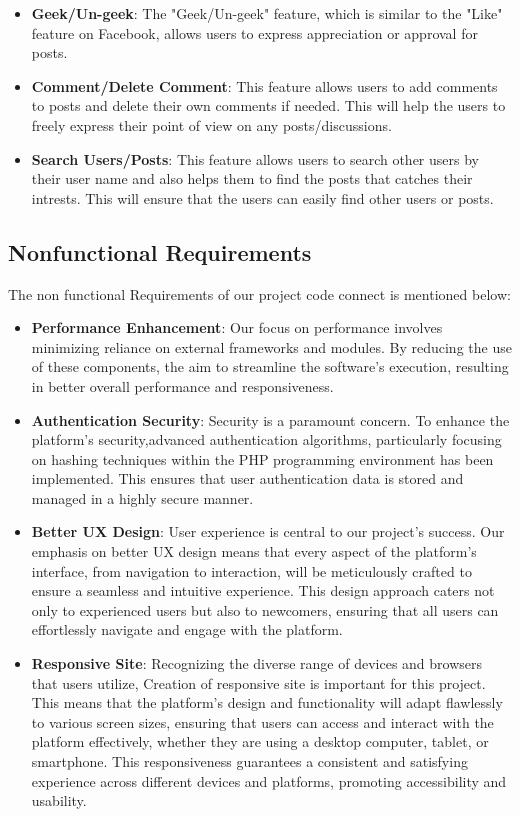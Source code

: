 \begin{itemize}
    \item \textbf{Geek/Un-geek}:
      The "Geek/Un-geek" feature, which is similar to the "Like" feature on Facebook, allows users to express appreciation or approval for posts. 

    \item \textbf{Comment/Delete Comment}:
      This feature allows users to add comments to posts and delete their own comments if needed. This will help the users to freely express their point of view on any posts/discussions. 

    \item \textbf{Search Users/Posts}:
    This feature allows users to search other users by their user name and also helps them to find the posts that catches their intrests. This will ensure that the users can easily find other users or posts.

  \end{itemize}
\subsection{Nonfunctional Requirements}
The non functional Requirements of our project code connect is mentioned below:
\begin{itemize}
    \item \textbf{Performance Enhancement}: Our focus on performance involves minimizing reliance on external frameworks and modules. By reducing the use of these components, the aim to streamline the software's execution, resulting in better overall performance and responsiveness.
    \item \textbf{Authentication Security}: Security is a paramount concern. To enhance the platform's security,advanced authentication algorithms, particularly focusing on hashing techniques within the PHP programming environment has been implemented. This ensures that user authentication data is stored and managed in a highly secure manner.
    \item \textbf{Better UX Design}: User experience is central to our project's success. Our emphasis on better UX design means that every aspect of the platform's interface, from navigation to interaction, will be meticulously crafted to ensure a seamless and intuitive experience. This design approach caters not only to experienced users but also to newcomers, ensuring that all users can effortlessly navigate and engage with the platform.
    \item \textbf{Responsive Site}: Recognizing the diverse range of devices and browsers that users utilize, Creation of responsive site is important for this project. This means that the platform's design and functionality will adapt flawlessly to various screen sizes, ensuring that users can access and interact with the platform effectively, whether they are using a desktop computer, tablet, or smartphone. This responsiveness guarantees a consistent and satisfying experience across different devices and platforms, promoting accessibility and usability.
    
  \end{itemize}
